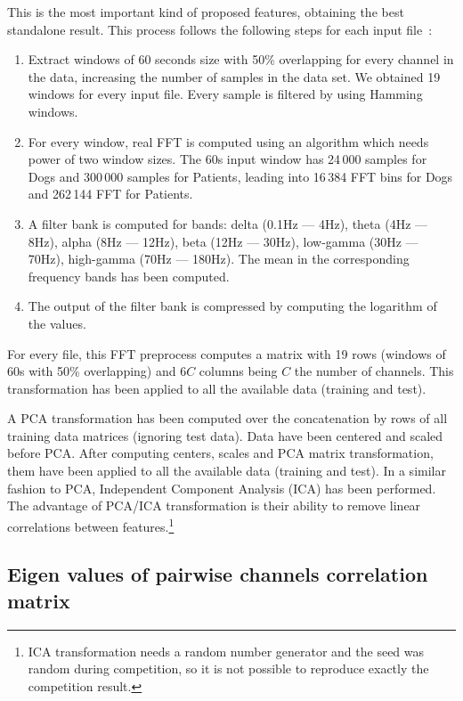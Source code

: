 \documentclass[a4paper,english,twoside]{article}
\begin{document}
This is the most important kind of proposed features, obtaining the best
standalone result. This process follows the following steps for each input
file~\cite{2014:howbert:plosone}:

\begin{enumerate}
\item
  Extract windows of 60 seconds size with 50\% overlapping for every
  channel in the data, increasing the number of samples in the data set.
  We obtained 19 windows for every input file. Every sample is filtered
  by using Hamming windows.
\item
  For every window, real FFT is computed using an algorithm which needs power of
  two window sizes. The 60s input window has 24\,000 samples for Dogs and
  300\,000 samples for Patients, leading into 16\,384 FFT bins for Dogs and
  262\,144 FFT for Patients.
\item A filter bank is computed for bands: delta (0.1Hz --- 4Hz), theta (4Hz ---
  8Hz), alpha (8Hz --- 12Hz), beta (12Hz --- 30Hz), low-gamma (30Hz --- 70Hz),
  high-gamma (70Hz --- 180Hz). The mean in the corresponding frequency bands has
  been computed.
\item
  The output of the filter bank is compressed by computing the logarithm
  of the values.
\end{enumerate}

For every file, this FFT preprocess computes a matrix with 19 rows (windows of
60s with 50\% overlapping) and $6C$ columns being $C$ the number of
channels. This transformation has been applied to all the available data
(training and test).

A PCA transformation has been computed over the concatenation by rows of all
training data matrices (ignoring test data). Data have been centered and scaled
before PCA. After computing centers, scales and PCA matrix transformation, them
have been applied to all the available data (training and test). In a similar
fashion to PCA, Independent Component Analysis (ICA) has been performed. The
advantage of PCA/ICA transformation is their ability to remove linear
correlations between features.\footnote{ICA transformation needs a random number
  generator and the seed was random during competition, so it is not possible to
  reproduce exactly the competition result.}

\subsection{Eigen values of pairwise channels correlation
  matrix}\label{eigen-values-of-pairwise-channels-correlation-matrix}
\end{document}
